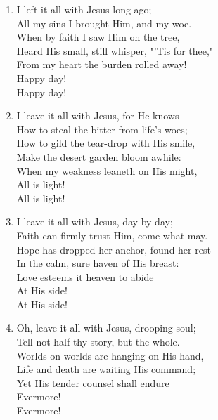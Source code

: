 \begin{enumerate}
    \item I left it all with Jesus long ago; \\
        All my sins I brought Him, and my woe. \\
        When by faith I saw Him on the tree, \\
        Heard His small, still whisper, "'Tis for thee," \\
        From my heart the burden rolled away! \\
        Happy day! \\
        Happy day!

    \item I leave it all with Jesus, for He knows \\
        How to steal the bitter from life's woes; \\
        How to gild the tear-drop with His smile, \\
        Make the desert garden bloom awhile: \\
        When my weakness leaneth on His might, \\
        All is light! \\
        All is light!

    \item I leave it all with Jesus, day by day; \\
        Faith can firmly trust Him, come what may. \\
        Hope has dropped her anchor, found her rest \\
        In the calm, sure haven of His breast: \\
        Love esteems it heaven to abide \\
        At His side! \\
        At His side!

    \item Oh, leave it all with Jesus, drooping soul; \\
        Tell not half thy story, but the whole. \\
        Worlds on worlds are hanging on His hand, \\
        Life and death are waiting His command; \\
        Yet His tender counsel shall endure \\
        Evermore! \\
        Evermore!

\end{enumerate}

